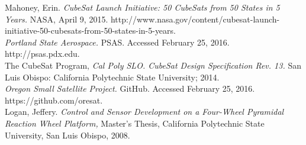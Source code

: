 \documentclass[]{aiaa-tc}%
\begin{document}
\begin{thebibliography}{9}%

Mahoney, Erin. {\it CubeSat Launch Initiative: 50 CubeSats from 50 States in 5 Years.} NASA, April 9, 2015. http://www.nasa.gov/content/cubesat-launch-initiative-50-cubesats-from-50-states-in-5-years.\\

{\it Portland State Aerospace.} PSAS. Accessed February 25, 2016. http://psas.pdx.edu.\\

The CubeSat Program, {\it Cal Poly SLO. CubeSat Design Specification Rev. 13.} San Luis
Obispo: California Polytechnic State University; 2014.\\

{\it Oregon Small Satellite Project.} GitHub. Accessed February 25, 2016. https://github.com/oresat.\\

Logan, Jeffery. {\it Control and Sensor Development on a Four-Wheel Pyramidal Reaction Wheel Platform,} Master’s Thesis, California Polytechnic State University, San Luis Obispo, 2008.\\


\end{thebibliography}
\end{document}
